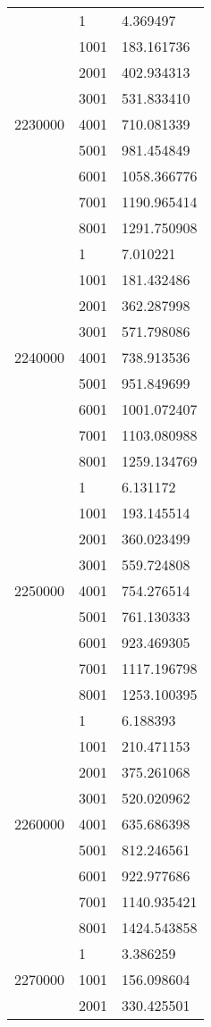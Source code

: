 \begin{table}[htb!]
\begin{tabular}{lll}
\multirow[c]{9}{*}{2230000} & 1 & 4.369497 \\
 & 1001 & 183.161736 \\
 & 2001 & 402.934313 \\
 & 3001 & 531.833410 \\
 & 4001 & 710.081339 \\
 & 5001 & 981.454849 \\
 & 6001 & 1058.366776 \\
 & 7001 & 1190.965414 \\
 & 8001 & 1291.750908 \\
\multirow[c]{9}{*}{2240000} & 1 & 7.010221 \\
 & 1001 & 181.432486 \\
 & 2001 & 362.287998 \\
 & 3001 & 571.798086 \\
 & 4001 & 738.913536 \\
 & 5001 & 951.849699 \\
 & 6001 & 1001.072407 \\
 & 7001 & 1103.080988 \\
 & 8001 & 1259.134769 \\
\multirow[c]{9}{*}{2250000} & 1 & 6.131172 \\
 & 1001 & 193.145514 \\
 & 2001 & 360.023499 \\
 & 3001 & 559.724808 \\
 & 4001 & 754.276514 \\
 & 5001 & 761.130333 \\
 & 6001 & 923.469305 \\
 & 7001 & 1117.196798 \\
 & 8001 & 1253.100395 \\
\multirow[c]{9}{*}{2260000} & 1 & 6.188393 \\
 & 1001 & 210.471153 \\
 & 2001 & 375.261068 \\
 & 3001 & 520.020962 \\
 & 4001 & 635.686398 \\
 & 5001 & 812.246561 \\
 & 6001 & 922.977686 \\
 & 7001 & 1140.935421 \\
 & 8001 & 1424.543858 \\
\multirow[c]{9}{*}{2270000} & 1 & 3.386259 \\
 & 1001 & 156.098604 \\
 & 2001 & 330.425501 \\

\end{tabular}
\end{table}
